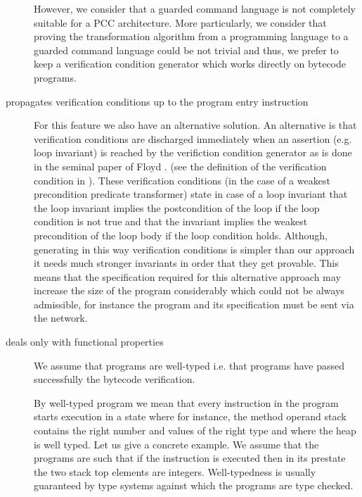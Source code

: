 \begin{description}
	However, we consider that a guarded command language 
	is not completely suitable for a PCC architecture.
	More particularly, we consider that proving the transformation algorithm from a programming language to a 
	guarded command language could be not trivial and thus, we prefer to keep a verification condition generator 
	which works directly on bytecode programs. 


  
   \item [propagates verification conditions up to the program entry instruction] 
         For this feature we also have an alternative solution. An alternative is that verification
	 conditions are discharged immediately when an assertion (e.g. loop invariant)
	 is reached by the verifiction condition generator as is done in the seminal paper of Floyd \cite{F67amp}.
	 (see the definition of the verification condition in \cite{gta05:fast}).
	 These verification conditions (in the case of a weakest precondition predicate transformer) state in case of a loop invariant
	 that the loop invariant implies the postcondition of the loop if the loop condition is not true and that the invariant implies the weakest precondition 
	 of the loop body if the loop condition holds. Although, generating in this way verification conditions is simpler 
	 than our approach it needs much stronger invariants in order that they get provable. This means that the specification 
	 required for this alternative approach may increase the size of the program considerably which could not be always admissible,
	 for instance the program and its specification must be sent via the network.

  \item [deals only with functional properties] 
        We assume that programs are well-typed i.e. that programs
	have passed successfully the bytecode verification. 

	
	By well-typed program we mean that  every
	instruction in the program starts execution in a  state where for instance, the method operand
	stack contains the right number and values of the right type
	and where the heap is well typed. Let us give a concrete example. We assume that the programs are such that
	if the instruction \arithOp{} is executed then in its prestate the two stack top elements are integers.
	Well-typedness is usually guaranteed by type systems against which the programs are type checked.
	

\end{description}
